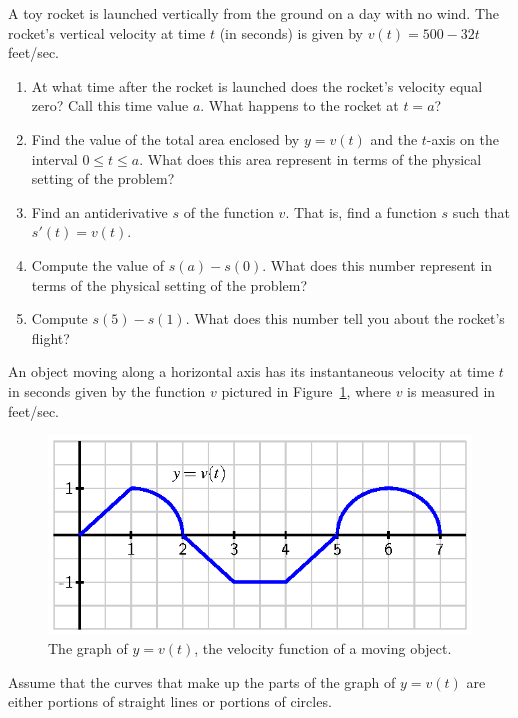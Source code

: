\begin{exercises}
\begin{enumerate}
\end{enumerate}
  \item A toy rocket is launched vertically from the ground on a day with no wind.  The rocket's vertical velocity at time $t$ (in seconds) is given by $v(t)= 500-32t$ feet/sec.
  \begin{enumerate}
  	\item At what time after the rocket is launched does the rocket's velocity equal zero?  Call this time value $a$.  What happens to the rocket at $t = a$?
	\item Find the value of the total area enclosed by $y = v(t)$ and the $t$-axis on the interval $0 \le t \le a$.  What does this area represent in terms of the physical setting of the problem?
	\item Find an antiderivative $s$ of the function $v$.  That is, find a function $s$ such that $s'(t) = v(t)$.
	\item Compute the value of $s(a) - s(0)$.  What does this number represent in terms of the physical setting of the problem?
	\item Compute $s(5) - s(1)$.  What does this number tell you about the rocket's flight?
  \end{enumerate}
  \item An object moving along a horizontal axis has its instantaneous velocity at time $t$ in seconds given by the function $v$ pictured in Figure~\ref{F:4.1.Ez3}, where $v$ is measured in feet/sec.
  \begin{figure}[h]
\begin{center}
\includegraphics{figures/4_1_Ez3.eps}
\caption{The graph of $y = v(t)$, the velocity function of a moving object.} \label{F:4.1.Ez3}
\end{center}
\end{figure}
Assume that the curves that make up the parts of the graph of $y=v(t)$ are either portions of straight lines or portions of circles.

\end{exercises}
